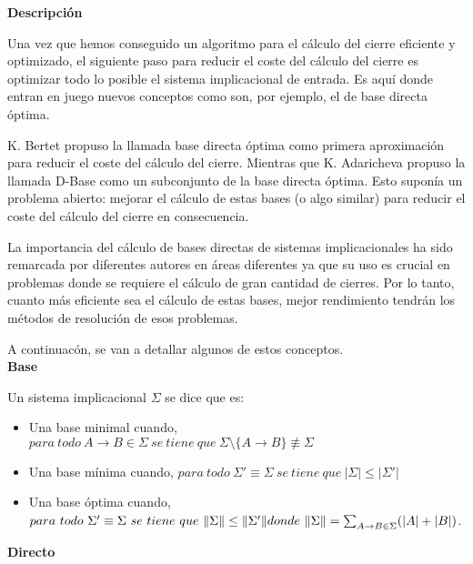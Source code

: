 \textbf{Descripci\'on} 


Una vez que hemos conseguido un algoritmo para el c\'alculo del cierre eficiente y optimizado, el siguiente paso para reducir el coste del c\'alculo del cierre es optimizar todo lo posible el sistema implicacional de entrada. Es aqu\'i donde entran en juego nuevos conceptos como son, por ejemplo, el de base directa \'optima.

K. Bertet \cite{BERTET20102155} propuso la llamada base directa \'optima como primera aproximaci\'on para reducir el coste del c\'alculo del cierre. Mientras que  K. Adaricheva \cite{Adaricheva} propuso la llamada D-Base como un subconjunto de la base directa \'optima. Esto supon\'ia un problema abierto: mejorar el c\'alculo de estas bases (o algo similar) para reducir el coste del c\'alculo del cierre en consecuencia.

La importancia del c\'alculo de bases directas de sistemas implicacionales ha sido remarcada por diferentes autores en \'areas diferentes ya que su uso es crucial en problemas donde se requiere el c\'alculo de gran cantidad de cierres. Por lo tanto, cuanto m\'as eficiente sea el c\'alculo de estas bases, mejor rendimiento tendr\'an los m\'etodos de resoluci\'on de esos problemas. 

A continuac\'on, se van a detallar algunos de estos conceptos.\\


\textbf{Base}

Un sistema implicacional \( \Sigma \) se dice que es:
\begin{itemize}
    \item Una base minimal cuando,  \( para \ todo \ A \to B \in \Sigma \ se \ tiene \ que \ \Sigma \setminus \{A \to B\} \not\equiv \Sigma\)

    \item Una base m\'inima cuando,  \( para \ todo \ \Sigma' \equiv \Sigma \ se \ tiene \ que \ |\Sigma| \leq |\Sigma'|\)

    \item Una base \'optima cuando,  \( para \ todo \ \Sigma' \equiv \Sigma \ se \ tiene \ que \ \|\Sigma\| \leq \|\Sigma'\| \\ donde \ \|\Sigma\| = 
    \sum_{\substack{A \to B \in \Sigma}} (|A|+|B|) \).
\end{itemize}
\newpage
\textbf{Directo}

